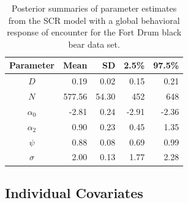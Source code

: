 \begin{table}[ht]
\centering
\caption{Posterior summaries of parameter estimates from the SCR model with a 
global behavioral response of encounter for the Fort Drum black bear data set.}
\begin{tabular}{crrrr}
\hline \hline
Parameter & Mean & SD & 2.5\% & 97.5\% \\
\hline
$D$           &    0.19     &  0.02    & 0.15 & 0.21 \\
$N$           &   577.56 &  54.30  & 452  & 648  \\
$\alpha_0$  &    -2.81     & 0.24    & -2.91  & -2.36  \\
$\alpha_2$  & 0.90  &  0.23   & 0.45  &  1.35 \\
$\psi$  &   0.88 &  0.08  &  0.69 & 0.99  \\
$\sigma$ & 2.00 &  0.13  &   1.77 & 2.28  \\ \hline
\end{tabular}
\label{covariates.tab.SCRb}
\end{table}


\subsection{Individual Covariates}
\label{covariates.sec.sex}



